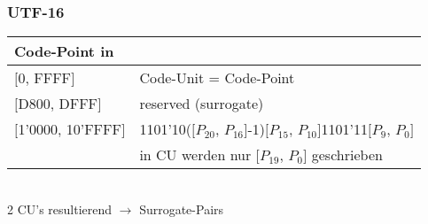 \subsubsection{UTF-16}
\begin{tabular}{ll}
  Code-Point in & \\
   \hline
  $[$0, FFFF$]$ & Code-Unit = Code-Point\\
$[$D800, DFFF$]$ & reserved (surrogate)\\
$[$1'0000, 10'FFFF$]$ &   1101'10($[P_{20}$, $P_{16}]$-1)$[P_{15}$, $P_{10}]$1101'11$[P_{9}$, $P_{0}]$\\
& in CU werden nur $[P_{19}$, $P_{0}]$ geschrieben
 \end{tabular}\\
2 CU's resultierend $\rightarrow$ Surrogate-Pairs


